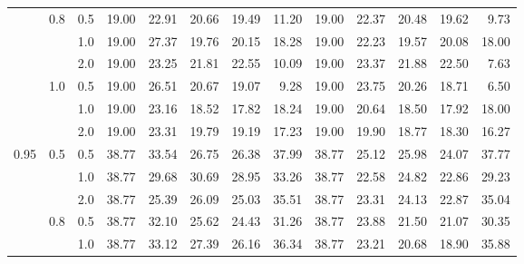 \documentclass{article}
\begin{document}
{\begin{tabular}{lllrrrrrrrrrr}
          & 0.8 & 0.5 &   19.00 &       22.91 &                 20.66 &                    19.49 &          11.20 &   19.00 &       22.37 &                 20.48 &                    19.62 &           9.73 \\
          &     & 1.0 &   19.00 &       27.37 &                 19.76 &                    20.15 &          18.28 &   19.00 &       22.23 &                 19.57 &                    20.08 &          18.00 \\
          &     & 2.0 &   19.00 &       23.25 &                 21.81 &                    22.55 &          10.09 &   19.00 &       23.37 &                 21.88 &                    22.50 &           7.63 \\
          & 1.0 & 0.5 &   19.00 &       26.51 &                 20.67 &                    19.07 &           9.28 &   19.00 &       23.75 &                 20.26 &                    18.71 &           6.50 \\
          &     & 1.0 &   19.00 &       23.16 &                 18.52 &                    17.82 &          18.24 &   19.00 &       20.64 &                 18.50 &                    17.92 &          18.00 \\
          &     & 2.0 &   19.00 &       23.31 &                 19.79 &                    19.19 &          17.23 &   19.00 &       19.90 &                 18.77 &                    18.30 &          16.27 \\
     0.95 & 0.5 & 0.5 &   38.77 &       33.54 &                 26.75 &                    26.38 &          37.99 &   38.77 &       25.12 &                 25.98 &                    24.07 &          37.77 \\
          &     & 1.0 &   38.77 &       29.68 &                 30.69 &                    28.95 &          33.26 &   38.77 &       22.58 &                 24.82 &                    22.86 &          29.23 \\
          &     & 2.0 &   38.77 &       25.39 &                 26.09 &                    25.03 &          35.51 &   38.77 &       23.31 &                 24.13 &                    22.87 &          35.04 \\
          & 0.8 & 0.5 &   38.77 &       32.10 &                 25.62 &                    24.43 &          31.26 &   38.77 &       23.88 &                 21.50 &                    21.07 &          30.35 \\
          &     & 1.0 &   38.77 &       33.12 &                 27.39 &                    26.16 &          36.34 &   38.77 &       23.21 &                 20.68 &                    18.90 &          35.88 \\

\end{tabular}}
\end{document}
